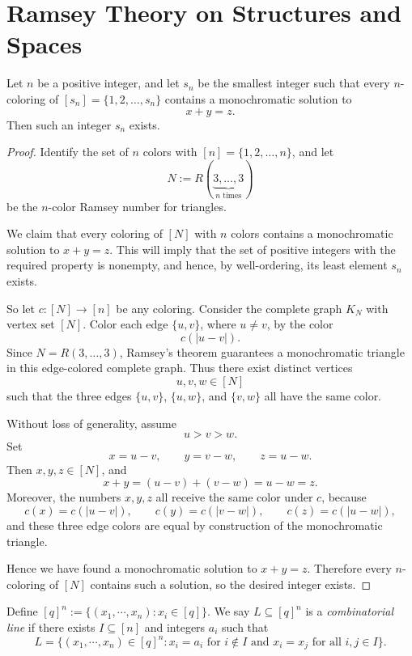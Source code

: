 \documentclass[11pt, a4paper]{ctexrep}
\begin{document}
\section{Ramsey Theory on Structures and Spaces}

\begin{theorem}
    Let $n$ be a positive integer, and let $s_n$ be the smallest integer such that every
    $n$-coloring of $[s_n]=\{1,2,\dots,s_n\}$ contains a monochromatic solution to
    \[
        x+y=z.
    \]
    Then such an integer $s_n$ exists.
\end{theorem}

\begin{proof}
    Identify the set of $n$ colors with $[n]=\{1,2,\dots,n\}$, and let
    \[
        N:=R(\underbrace{3,\dots,3}_{n\text{ times}})
    \]
    be the $n$-color Ramsey number for triangles.

    We claim that every coloring of $[N]$ with $n$ colors contains a monochromatic
    solution to $x+y=z$. This will imply that the set of positive integers with the
    required property is nonempty, and hence, by well-ordering, its least element
    $s_n$ exists.

    So let $c:[N]\to [n]$ be any coloring. Consider the complete graph $K_N$ with
    vertex set $[N]$. Color each edge $\{u,v\}$, where $u\neq v$, by the color
    \[
        c(|u-v|).
    \]
    Since $N=R(3,\dots,3)$, Ramsey's theorem guarantees a monochromatic triangle in
    this edge-colored complete graph. Thus there exist distinct vertices
    \[
        u,v,w\in [N]
    \]
    such that the three edges $\{u,v\}$, $\{u,w\}$, and $\{v,w\}$ all have the same
    color.

    Without loss of generality, assume
    \[
        u>v>w.
    \]
    Set
    \[
        x=u-v,\qquad y=v-w,\qquad z=u-w.
    \]
    Then $x,y,z\in [N]$, and
    \[
        x+y=(u-v)+(v-w)=u-w=z.
    \]
    Moreover, the numbers $x,y,z$ all receive the same color under $c$, because
    \[
        c(x)=c(|u-v|),\qquad c(y)=c(|v-w|),\qquad c(z)=c(|u-w|),
    \]
    and these three edge colors are equal by construction of the monochromatic triangle.

    Hence we have found a monochromatic solution to $x+y=z$. Therefore every
    $n$-coloring of $[N]$ contains such a solution, so the desired integer exists.
\end{proof}

\begin{definition}
    Define $[q]^n:=\{(x_1,\cdots,x_n):x_i\in [q]\}$. We say $L\subseteq[q]^n$ is a \emph{combinatorial line} if there exists $I\subseteq [n]$ and integers $a_i$ such that
    $$
        L=\{(x_1,\cdots,x_n)\in [q]^n:x_i=a_i\text{ for }i\notin I\text{ and }x_i=x_j\text{ for all }i,j\in I\}.
    $$
\end{definition}
\end{document}
